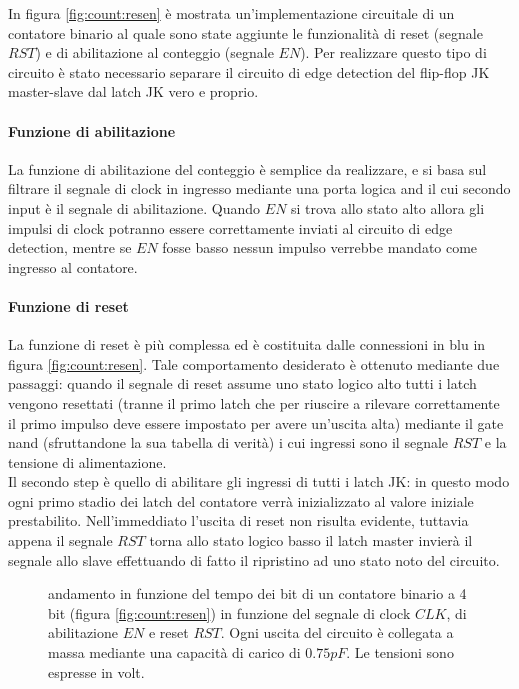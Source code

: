	In figura \ref{fig:count:resen} è mostrata un'implementazione circuitale di un contatore binario al quale sono state aggiunte le funzionalità di reset (segnale $RST$) e di abilitazione al conteggio (segnale $EN$). Per realizzare questo tipo di circuito è stato necessario separare il circuito di edge detection del flip-flop JK master-slave dal latch JK vero e proprio. 
	
	\paragraph{Funzione di abilitazione} La funzione di abilitazione del conteggio è semplice da realizzare, e si basa sul filtrare il segnale di clock in ingresso mediante una porta logica and il cui secondo input è il segnale di abilitazione. Quando $EN$ si trova allo stato alto allora gli impulsi di clock potranno essere correttamente inviati al circuito di edge detection, mentre se $EN$ fosse basso nessun impulso verrebbe mandato come ingresso al contatore.
	
	\paragraph{Funzione di reset} La funzione di reset è più complessa ed è costituita dalle connessioni in blu in figura \ref{fig:count:resen}. Tale comportamento desiderato è ottenuto mediante due passaggi: quando il segnale di reset assume uno stato logico alto tutti i latch vengono resettati (tranne il primo latch che per riuscire a rilevare correttamente il primo impulso deve essere impostato per avere un'uscita alta) mediante il gate nand (sfruttandone la sua tabella di verità) i cui ingressi sono il segnale $RST$ e la tensione di alimentazione.\\
	Il secondo step è quello di abilitare gli ingressi di tutti i latch JK: in questo modo ogni primo stadio dei latch del contatore verrà inizializzato al valore iniziale prestabilito. Nell'immeddiato l'uscita di reset non risulta evidente, tuttavia appena il segnale $RST$ torna allo stato logico basso il latch master invierà il segnale allo slave effettuando di fatto il ripristino ad uno stato noto del circuito.
	
	
	\begin{figure}[p]
		\centering
		
		\vspace{4mm}
		\caption{andamento in funzione del tempo dei bit di un contatore binario a 4 bit (figura \ref{fig:count:resen}) in funzione del segnale di clock $CLK$, di abilitazione $EN$ e reset $RST$. Ogni uscita del circuito è collegata a massa mediante una capacità di carico di $0.75pF$. Le tensioni sono espresse in volt.  }
		\label{fig:count:simresen}
	\end{figure}

